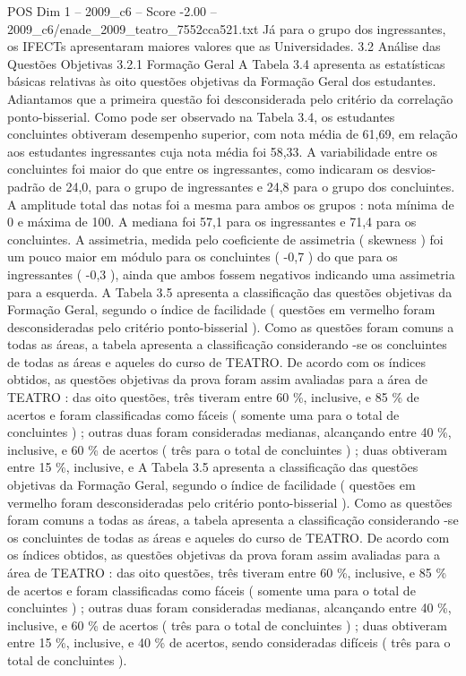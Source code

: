\begin{textsample}{POS Dim 1 – 2009\_c6 – Score -2.00 – 2009\_c6/enade\_2009\_teatro\_7552cca521.txt}
Já para o grupo dos ingressantes, os IFECTs apresentaram maiores valores que as Universidades. 3.2 Análise das Questões Objetivas 3.2.1 Formação Geral A Tabela 3.4 apresenta as estatísticas básicas relativas às oito questões objetivas da Formação Geral dos estudantes.
Adiantamos que a primeira questão foi desconsiderada pelo critério da correlação ponto-bisserial.
Como pode ser observado na Tabela 3.4, os estudantes concluintes obtiveram desempenho superior, com nota média de 61,69, em relação aos estudantes ingressantes cuja nota média foi 58,33.
A variabilidade entre os concluintes foi maior do que entre os ingressantes, como indicaram os desvios-padrão de 24,0, para o grupo de ingressantes e 24,8 para o grupo dos concluintes.
A amplitude total das notas foi a mesma para ambos os grupos : nota mínima de 0 e máxima de 100.
A mediana foi 57,1 para os ingressantes e 71,4 para os concluintes.
A assimetria, medida pelo coeficiente de assimetria ( skewness ) foi um pouco maior em módulo para os concluintes ( -0,7 ) do que para os ingressantes ( -0,3 ), ainda que ambos fossem negativos indicando uma assimetria para a esquerda.
A Tabela 3.5 apresenta a classificação das questões objetivas da Formação Geral, segundo o índice de facilidade ( questões em vermelho foram desconsideradas pelo critério ponto-bisserial ).
Como as questões foram comuns a todas as áreas, a tabela apresenta a classificação considerando -se os concluintes de todas as áreas e aqueles do curso de TEATRO.
De acordo com os índices obtidos, as questões objetivas da prova foram assim avaliadas para a área de TEATRO : das oito questões, três tiveram entre 60 \%, inclusive, e 85 \% de acertos e foram classificadas como fáceis ( somente uma para o total de concluintes ) ; outras duas foram consideradas medianas, alcançando entre 40 \%, inclusive, e 60 \% de acertos ( três para o total de concluintes ) ; duas obtiveram entre 15 \%, inclusive, e A Tabela 3.5 apresenta a classificação das questões objetivas da Formação Geral, segundo o índice de facilidade ( questões em vermelho foram desconsideradas pelo critério ponto-bisserial ).
Como as questões foram comuns a todas as áreas, a tabela apresenta a classificação considerando -se os concluintes de todas as áreas e aqueles do curso de TEATRO.
De acordo com os índices obtidos, as questões objetivas da prova foram assim avaliadas para a área de TEATRO : das oito questões, três tiveram entre 60 \%, inclusive, e 85 \% de acertos e foram classificadas como fáceis ( somente uma para o total de concluintes ) ; outras duas foram consideradas medianas, alcançando entre 40 \%, inclusive, e 60 \% de acertos ( três para o total de concluintes ) ; duas obtiveram entre 15 \%, inclusive, e 40 \% de acertos, sendo consideradas difíceis ( três para o total de concluintes ).

\end{textsample}
